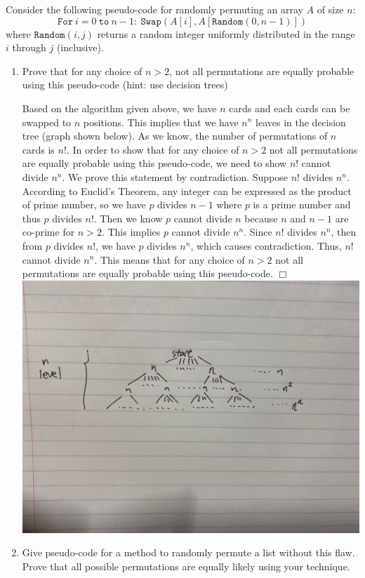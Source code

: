 \documentclass[10pt]{article}
\newenvironment{proof}{\par\noindent{\it Proof.}\hspace*{1em}}{$\Box$\bigskip}
\begin{document}
Consider the following pseudo-code for randomly permuting an array $A$ of size $n$:
\[ \mathtt{For} \ i = 0 \ \mathtt{to} \ n-1: \ \mathtt{Swap}(A[i], A[\mathtt{Random}(0,n-1)]) \]
 where $\mathtt{Random}(i,j)$ returns a random integer uniformly distributed in the range $i$ through $j$ (inclusive).
\begin{enumerate}
    \item Prove that for any choice of $n>2$, not all permutations are equally probable using this pseudo-code (hint: use decision trees)
    \begin{proof}
    Based on the algorithm given above, we have $n$ cards and each cards can be swapped to $n$ positions. This implies that we have $n^n$ leaves in the decision tree (graph shown below). As we know, the number of permutations of $n$ cards is $n!$. In order to show that for any choice of $n>2$ not all permutations are equally probable using this pseudo-code, we need to show $n!$ cannot divide $n^n$. We prove this statement by contradiction. Suppose $n!$ divides $n^n$. According to Euclid's Theorem, any integer can be expressed as the product of prime number, so we have $p$ divides $n-1$ where $p$ is a prime number and thus $p$ divides $n!$. Then we know $p$ cannot divide $n$ because $n$ and $n-1$ are co-prime for $n>2$. This implies $p$ cannot divide $n^n$. Since $n!$ divides $n^n$, then from $p$ divides $n!$, we have $p$ divides $n^n$, which causes contradiction. Thus, $n!$ cannot divide $n^n$. This means that for any choice of $n>2$ not all permutations are equally probable using this pseudo-code. 
    \end{proof}
    \includegraphics[scale=0.15]{pic3.jpeg}
    \item Give pseudo-code for a method to randomly permute a list without this flaw. Prove that all possible permutations are equally likely using your technique.
    

\end{enumerate}
\end{document}

